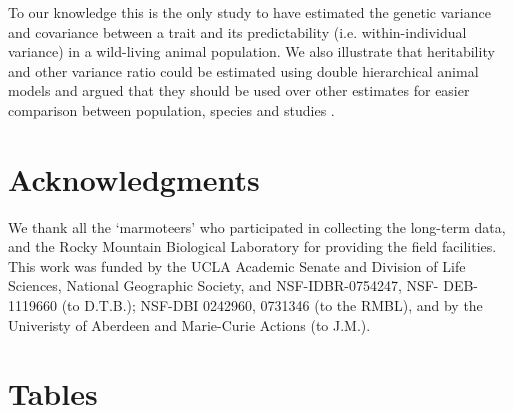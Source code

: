 \documentclass[a4paper,12pt,twoside]{article}
\begin{document}
	To our knowledge this is the only study to have estimated the genetic variance and covariance between a trait and its predictability (i.e. within-individual variance) in a wild-living animal population.
	We also illustrate that heritability and other variance ratio could be estimated using double hierarchical animal models and argued that they should be used over other estimates for easier comparison between population, species and studies \citep{Stamps2012,Cleasby2015,Reale2009c}.
	
	\section*{Acknowledgments}
	We thank all the ‘marmoteers’ who participated in collecting the long-term data, and the Rocky Mountain Biological Laboratory for providing the field facilities. 
	This work was funded by the UCLA Academic Senate and Division of Life Sciences, National Geographic Society, and NSF-IDBR-0754247, NSF- DEB-1119660 (to D.T.B.); NSF-DBI 0242960, 0731346 (to the RMBL), and by the Univeristy of Aberdeen and Marie-Curie Actions (to J.M.).
	
	

	
	
	\newpage
	\section*{Tables}
	
\end{document}
